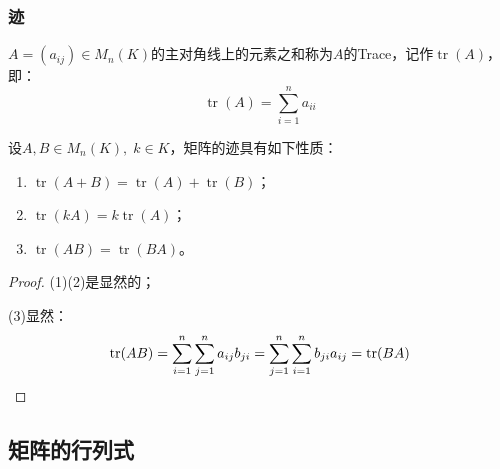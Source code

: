 \subsubsection{迹}
\begin{definition}
	$A=(a_{ij})\in M_{n}(K)$的主对角线上的元素之和称为$A$的\gls{Trace}，记作$\operatorname{tr}(A)$，即：
	\begin{equation*}
		\operatorname{tr}(A)=\sum_{i=1}^{n}a_{ii}
	\end{equation*}
\end{definition}
\begin{property}\label{prop:Trace}
	设$A,B\in M_{n}(K),\;k\in K$，矩阵的迹具有如下性质：
	\begin{enumerate}
		\item $\operatorname{tr}(A+B)=\operatorname{tr}(A)+\operatorname{tr}(B)$；
		\item $\operatorname{tr}(kA)=k\operatorname{tr}(A)$；
		\item $\operatorname{tr}(AB)=\operatorname{tr}(BA)$。
	\end{enumerate}
\end{property}
\begin{proof}
	(1)(2)是显然的；\par
	(3)显然：
	\begin{gather*}
		\operatorname{tr}(AB)=\sum_{i=1}^{n}\sum_{j=1}^{n}a_{ij}b_{ji}=\sum_{j=1}^{n}\sum_{i=1}^{n}b_{ji}a_{ij}=\operatorname{tr}(BA)\qedhere
	\end{gather*}
\end{proof}

\subsection{矩阵的行列式}
